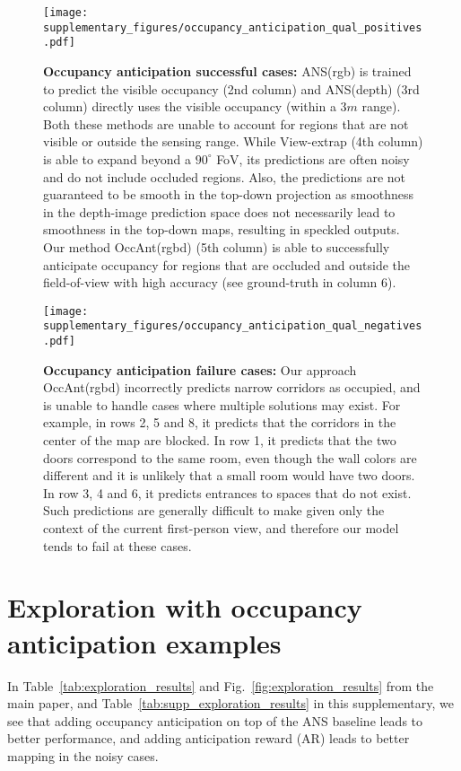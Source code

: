 \documentclass[runningheads]{llncs}
\begin{document}
\begin{figure}
    \centering
    \texttt{[image: supplementary\_figures/occupancy\_anticipation\_qual\_positives.pdf]}
    \caption{\small \textbf{Occupancy anticipation successful cases:} ANS(rgb) is trained to predict the visible occupancy (2nd column) and ANS(depth) (3rd column) directly uses the visible occupancy (within a $3\si{m}$ range). Both these methods are unable to account for regions that are not visible or outside the sensing range. While View-extrap (4th column) is able to expand beyond a $90^\circ$ FoV, its predictions are often noisy and do not include occluded regions. Also, the predictions are not guaranteed to be smooth in the top-down projection as smoothness in the depth-image prediction space does not necessarily lead to smoothness in the top-down maps, resulting in speckled outputs. Our method OccAnt(rgbd) (5th column) is able to successfully anticipate occupancy for regions that are occluded and outside the field-of-view with high accuracy (see ground-truth in column 6).}
    \label{fig:occ_ant_positives}
\end{figure}

\begin{figure}
    \centering
    \texttt{[image: supplementary\_figures/occupancy\_anticipation\_qual\_negatives.pdf]}
    \caption{\small \textbf{Occupancy anticipation failure cases:} Our approach OccAnt(rgbd) incorrectly predicts narrow corridors as occupied, and is unable to handle cases where multiple solutions may exist. For example, in rows 2, 5 and 8, it predicts that the corridors in the center of the map are blocked. In row 1, it predicts that the two doors correspond to the same room, even though the wall colors are different and it is unlikely that a small room would have two doors. In row 3, 4 and 6, it predicts entrances to spaces that do not exist. Such predictions are generally difficult to make given only the context of the current first-person view, and therefore our model tends to fail at these cases.}
    \label{fig:occ_ant_negatives}
\end{figure}


\section{Exploration with occupancy anticipation examples}
\label{sec:supp_exploration_qualitative}
In Table~\ref{tab:exploration_results} and Fig.~\ref{fig:exploration_results} from the main paper, and Table~\ref{tab:supp_exploration_results} in this supplementary, we see that adding occupancy anticipation on top of the ANS baseline leads to better performance, and adding anticipation reward (AR) leads to better mapping in the noisy cases.
\end{document}

